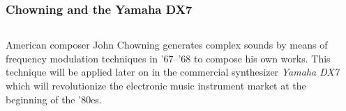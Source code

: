 \begin{frame}
    \frametitle{Chowning and the Yamaha DX7}
    
    \begin{columns}[T]
        \begin{column}{0.6\textwidth}
						\alert{American composer John Chowning generates complex sounds by means
						of frequency modulation techniques in '67--'68 to compose his own works.
						This technique will be applied later on in the commercial
						synthesizer \emph{Yamaha DX7} which will revolutionize the
						electronic music instrument market at the beginning of the '80es.}
        \end{column}
        \begin{column}{0.4\textwidth}
            \begin{center}
            \end{center}
            \hspace{-4cm}
        \end{column}
    \end{columns}

\end{frame}

